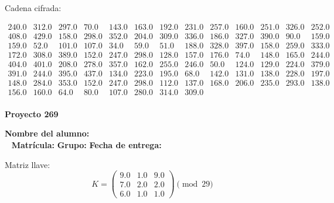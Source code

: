 \documentclass[12pt]{article}
\begin{document}
Cadena cifrada:
\begin{center}
$\begin{array}{lllllllllllll}
240.0 & 312.0 & 297.0 & 70.0 & 143.0 & 163.0 & 192.0 & 231.0 & 257.0 & 160.0 & 251.0 & 326.0 & 252.0\\
408.0 & 429.0 & 158.0 & 298.0 & 352.0 & 204.0 & 309.0 & 336.0 & 186.0 & 327.0 & 390.0 & 90.0 & 159.0\\
159.0 & 52.0 & 101.0 & 107.0 & 34.0 & 59.0 & 51.0 & 188.0 & 328.0 & 397.0 & 158.0 & 259.0 & 333.0\\
172.0 & 308.0 & 389.0 & 152.0 & 247.0 & 298.0 & 128.0 & 157.0 & 176.0 & 74.0 & 148.0 & 165.0 & 244.0\\
404.0 & 401.0 & 208.0 & 278.0 & 357.0 & 162.0 & 255.0 & 246.0 & 50.0 & 124.0 & 129.0 & 224.0 & 379.0\\
391.0 & 244.0 & 395.0 & 437.0 & 134.0 & 223.0 & 195.0 & 68.0 & 142.0 & 131.0 & 138.0 & 228.0 & 197.0\\
148.0 & 284.0 & 353.0 & 152.0 & 247.0 & 298.0 & 112.0 & 137.0 & 168.0 & 206.0 & 235.0 & 293.0 & 138.0\\
156.0 & 160.0 & 64.0 & 80.0 & 107.0 & 280.0 & 314.0 & 309.0\\
\end{array}$
\end{center}

\newpage


\textbf{Proyecto 269}

\textbf{Nombre del alumno:} \underline{\hspace{13cm}}\\\
\vspace{1cm}
\textbf{Matrícula:} \underline{\hspace{4cm}} \hspace{1cm}
\textbf{Grupo:} \underline{\hspace{2cm}}
\textbf{Fecha de entrega:} \underline{\hspace{2cm}}

\medskip

Matriz llave:
\[
K = \begin{pmatrix}
9.0 & 1.0 & 9.0\\
7.0 & 2.0 & 2.0\\
6.0 & 1.0 & 1.0
\end{pmatrix} \pmod{29}
\]
\end{document}
